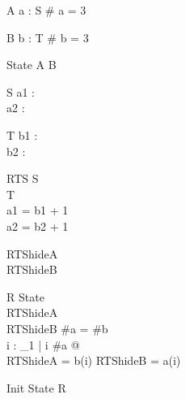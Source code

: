 \begin{schema}{A}
a : \seq S
\where
\# a = 3
\end{schema}

\begin{schema}{B}
b : \seq T
\where
\# b = 3
\end{schema}

\begin{zed}
State  A \land B
\end{zed}

\begin{schema}{S}
a1 : \nat\\
a2 : \nat
\end{schema}

\begin{schema}{T}
b1 : \nat\\
b2 : \nat
\end{schema}

\begin{schema}{RTS}
S\\
T\\
\where
a1 = b1 + 1\\
a2 = b2 + 1
\end{schema}

\begin{zed}
RTShideA \\
RTShideB 
\end{zed}

%
%
\begin{schema}{R}
State\\
RTShideA\\
RTShideB
\where
\#a = \#b\\
\forall i : \nat_1 | i \leq \#a @ \\
      \theta RTShideA = b(i) \land \theta RTShideB = a(i)
\end{schema}

\begin{schema}{Init}
State
\where
R
\end{schema}
